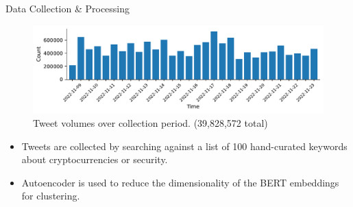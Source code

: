 \documentclass[final]{beamer}
\newlength{\gap}
\newlength{\titleheight}
\newlength{\contentheight}
\newcommand{\clusterInfo}[3][]{%
  \pgfkeys{/clusterInfo, default, #1}%

  \setlength{\gap}{\clusterInfoGapWidth}
  \pgfmathsetlength{\titleheight}{\clusterInfoTitleHeight}
  \pgfmathsetlength{\contentheight}{\clusterInfoHeight-\clusterInfoTitleHeight-3\gap}

  \node[
    container,
    inner sep=0pt,
    fill=\clusterInfoColor!20,
    minimum width=\clusterInfoWidth,
    minimum height=\clusterInfoHeight
  ] (\clusterInfoKey_Box) 
  at \clusterInfoPlacement {};

  \node[
    title,
    minimum width=\clusterInfoWidth-2\gap,
    minimum height=\titleheight
  ] (\clusterInfoKey_Title)
  at ($(\clusterInfoKey_Box.north) + (0,-0.5\titleheight-\gap)$) {
    #2
  };

  \node[
    content,
    minimum width=\clusterInfoWidth-2\gap,
    minimum height=\clusterInfoHeight-\titleheight-3\gap
  ] (\clusterInfoKey_Content) 
  at ($(\clusterInfoKey_Box.north) + (0,-\titleheight-2\gap-0.5\contentheight)$) {
    \begin{minipage}{\clusterInfoWidth-4\gap}
      \vspace{0em}
      \centering
      #3
    \end{minipage}
  };
}
\begin{document}
\begin{frame}[t]
\begin{columns}[t]
\begin{column}{0.73\paperwidth}
\begin{block}{Data Collection \& Processing}
				\vspace{-6.2em}

				\begin{minipage}{0.44\textwidth}
					\begin{figure}
						\centering
						\includegraphics[width=\textwidth]{./figures/Data_Collection/tweet_volumes.pdf}
						{\color{rpi_darkgray} \small Tweet volumes over collection period. (39,828,572 total)}
					\end{figure}
				\end{minipage}
				\begin{minipage}{0.55\textwidth}
					\centering
					\begin{itemize}
						\large
						\item Tweets are collected by searching against a list of 100 hand-curated keywords about cryptocurrencies or security.
						\item Autoencoder is used to reduce the dimensionality of the BERT embeddings for clustering.
					\end{itemize}
				\end{minipage}

			\end{block}


\end{column}
\end{columns}
\end{frame}
\end{document}

